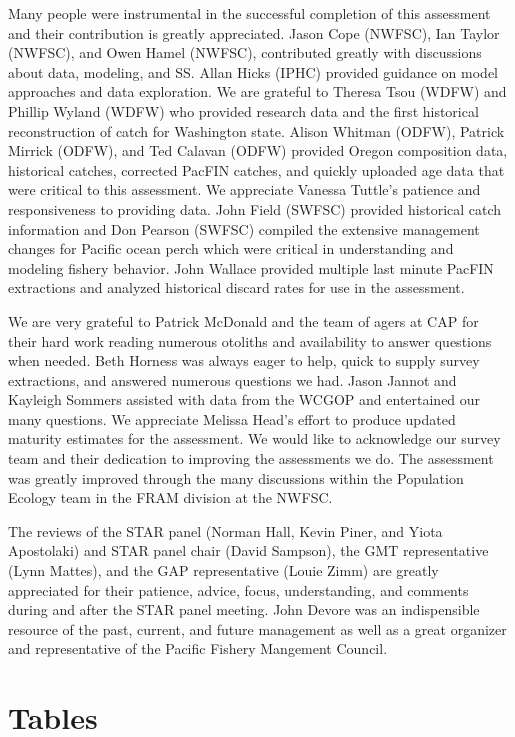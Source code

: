 \documentclass[12pt,]{article}
\begin{document}
Many people were instrumental in the successful completion of this
assessment and their contribution is greatly appreciated. Jason Cope
(NWFSC), Ian Taylor (NWFSC), and Owen Hamel (NWFSC), contributed greatly
with discussions about data, modeling, and SS. Allan Hicks (IPHC)
provided guidance on model approaches and data exploration. We are
grateful to Theresa Tsou (WDFW) and Phillip Wyland (WDFW) who provided
research data and the first historical reconstruction of catch for
Washington state. Alison Whitman (ODFW), Patrick Mirrick (ODFW), and Ted
Calavan (ODFW) provided Oregon composition data, historical catches,
corrected PacFIN catches, and quickly uploaded age data that were
critical to this assessment. We appreciate Vanessa Tuttle's patience and
responsiveness to providing data. John Field (SWFSC) provided historical
catch information and Don Pearson (SWFSC) compiled the extensive
management changes for Pacific ocean perch which were critical in
understanding and modeling fishery behavior. John Wallace provided
multiple last minute PacFIN extractions and analyzed historical discard
rates for use in the assessment.

We are very grateful to Patrick McDonald and the team of agers at CAP
for their hard work reading numerous otoliths and availability to answer
questions when needed. Beth Horness was always eager to help, quick to
supply survey extractions, and answered numerous questions we had. Jason
Jannot and Kayleigh Sommers assisted with data from the WCGOP and
entertained our many questions. We appreciate Melissa Head's effort to
produce updated maturity estimates for the assessment. We would like to
acknowledge our survey team and their dedication to improving the
assessments we do. The assessment was greatly improved through the many
discussions within the Population Ecology team in the FRAM division at
the NWFSC.

The reviews of the STAR panel (Norman Hall, Kevin Piner, and Yiota
Apostolaki) and STAR panel chair (David Sampson), the GMT representative
(Lynn Mattes), and the GAP representative (Louie Zimm) are greatly
appreciated for their patience, advice, focus, understanding, and
comments during and after the STAR panel meeting. John Devore was an
indispensible resource of the past, current, and future management as
well as a great organizer and representative of the Pacific Fishery
Mangement Council.

\newpage

\FloatBarrier

\section{Tables}\label{tables}
\end{document}
